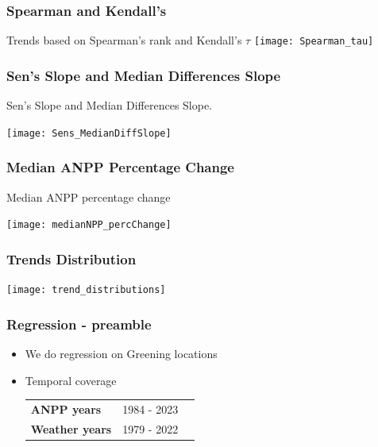\documentclass[serif, xcolor={dvipsnames}]{beamer} %
\begin{document}
\begin{frame}
\frametitle{Spearman and Kendall's}
Trends based on Spearman's rank and Kendall's $\tau$
\centering
\texttt{[image: Spearman\_tau]}
\end{frame}
\begin{frame}
\frametitle{Sen's Slope and Median Differences Slope}
Sen's Slope and Median Differences Slope.
\begin{center}
\texttt{[image: Sens\_MedianDiffSlope]}
\end{center}
\end{frame}
\begin{frame}
\frametitle{Median ANPP Percentage Change}
Median ANPP percentage change
\begin{center}
\texttt{[image: medianNPP\_percChange]}
\end{center}
\end{frame}
\begin{frame}
\frametitle{Trends Distribution}
\begin{center}
\texttt{[image: trend\_distributions]}
\end{center}
\end{frame}
\begin{frame}
\frametitle{Regression - preamble}
\begin{itemize}[<+->]
\item We do regression on Greening locations

\item Temporal coverage
\begin{table}[!ht]
\centering
\captionsetup{singlelinecheck=false, format=hang}
\label{tab:NPPWeatherYears}
\begin{tabular}{lll}
\bottomrule
\rowcolor{shadecolor} \textbf{ANPP years} &  1984 - 2023   \\ 
\textbf{Weather years}  & 1979 - 2022 \\
\toprule
\end{tabular}
\end{table}
\end{itemize}

\end{frame}
\end{document}
